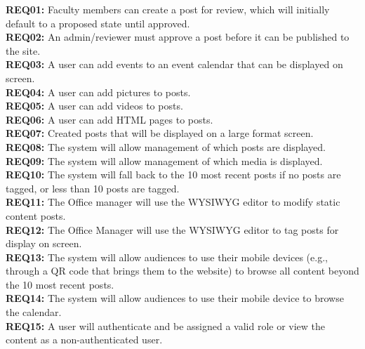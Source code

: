 \textbf{REQ01:} Faculty members can create a post for review, which will initially default to a proposed state until approved. \\
\textbf{REQ02:} An admin/reviewer must approve a post before it can be published to the site. \\
\textbf{REQ03:} A user can add events to an event calendar that can be displayed on screen. \\
\textbf{REQ04:} A user can add pictures to posts. \\
\textbf{REQ05:} A user can add videos to posts. \\
\textbf{REQ06:} A user can add HTML pages to posts. \\
\textbf{REQ07:} Created posts that will be displayed on a large format screen. \\
\textbf{REQ08:} The system will allow management of which posts are displayed. \\
\textbf{REQ09:} The system will allow management of which media is displayed. \\
\textbf{REQ10:} The system will fall back to the 10 most recent posts if no posts are tagged, or less than 10 posts are tagged. \\
\textbf{REQ11:} The Office manager will use the WYSIWYG editor to modify static content posts. \\
\textbf{REQ12:} The Office Manager will use the WYSIWYG editor to tag posts for display on screen. \\
\textbf{REQ13:} The system will allow audiences to use their mobile devices (e.g., through a QR code that brings them to the website) to browse all content beyond the 10 most recent posts. \\
\textbf{REQ14:} The system will allow audiences to use their mobile device to browse the calendar. \\
\textbf{REQ15:} A user will authenticate and be assigned a valid role or view the content as a non-authenticated user. \\